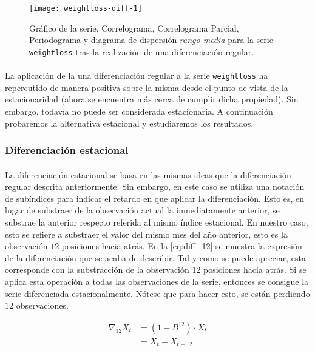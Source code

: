 \documentclass[a4paper, spanish]{article}
\begin{document}
        \begin{figure}[htb!]
          \texttt{[image: weightloss-diff-1]}
          \caption{Gráfico de la serie, Correlograma, Correlograma Parcial, Periodograma y diagrama de dispersión \emph{rango-media} para la serie \texttt{weightloss} tras la realización de una diferenciación regular.}
          \label{img:weightloss_diff_1}
        \end{figure}

        \paragraph{}
        La aplicación de la una diferenciación regular a la serie \texttt{weightloss} ha repercutido de manera positiva sobre la misma desde el punto de vista de la estacionaridad (ahora se encuentra más cerca de cumplir dicha propiedad). Sin embargo, todavía no puede ser considerada estacionaria. A continuación probaremos la alternativa estacional y estudiaremos los resultados.

      \subsubsection{Diferenciación estacional}
      \label{sec:seasonal_difference}

        \paragraph{}
        La diferenciación estacional se basa en las mismas ideas que la diferenciación regular descrita anteriormente. Sin embargo, en este caso se utiliza una notación de subíndices para indicar el retardo en que aplicar la diferenciación. Esto es, en lugar de substraer de la observación actual la inmediatamente anterior, se substrae la anterior respecto referida al mismo índice estacional. En nuestro caso, esto se refiere a substraer el valor del mismo mes del año anterior, esto es la observación $12$ posiciones hacia atrás. En la \autoref{eq:diff_12} se muestra la expresión de la diferenciación que se acaba de describir. Tal y como se puede apreciar, esta corresponde con la substracción de la observación $12$ posiciones hacia atrás. Si se aplica esta operación a todas las observaciones de la serie, entonces se consigue la serie diferenciada estacionalmente. Nótese que para hacer esto, se están perdiendo $12$ observaciones.

        \begin{equation}
        \label{eq:diff_12}
          \begin{split}
            \nabla_{12} X_t
            &= (1 - B^12) \cdot X_t \\
            &= X_t - X_{t - 12}
          \end{split}
        \end{equation}
\end{document}
